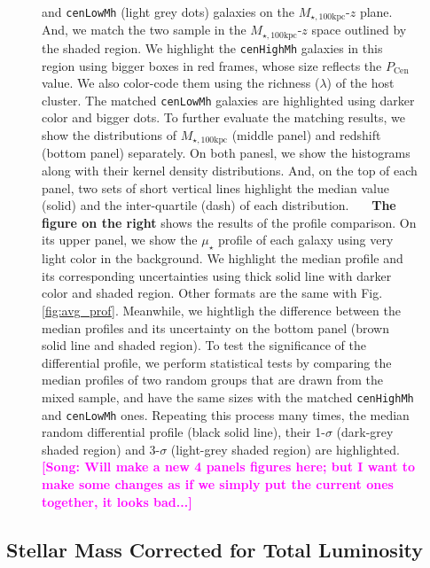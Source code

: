 \documentclass{emulateapj}
\def\rbcg{\texttt{cenHighMh}}
\def\nbcg{\texttt{cenLowMh}}
\def\mtot{{$M_{\star,100\mathrm{kpc}}$}}
\def\mden{{$\mu_{\star}$}}
\newcommand{\song}[1]{\textcolor{magenta}{\textbf{[Song: #1]}}}
\begin{document}
\begin{CJK*}{UTF8}{gbsn}
\begin{figure}[t!]
{      and \nbcg{} (light grey dots) galaxies on the \mtot{}-$z$ plane.  
      And, we match the two sample in the \mtot{}-$z$ space outlined by the shaded region.
      We highlight the \rbcg{} galaxies in this region using bigger boxes in red frames, 
      whose size reflects the $P_{\mathrm{Cen}}$ value.  
      We also color-code them using the richness ($\lambda$) of the host cluster. 
      The matched \nbcg{} galaxies are highlighted using darker color and bigger dots. 
      To further evaluate the matching results, we show the distributions of \mtot{} 
      (middle panel) and redshift (bottom panel) separately. 
      On both panesl, we show the histograms along with their kernel density 
      distributions.  
      And, on the top of each panel, two sets of short vertical lines highlight the median 
      value (solid) and the inter-quartile (dash) of each distribution.~~~
      \textbf{The figure on the right} shows the results of the profile comparison.  
      On its upper panel, we show the \mden{} profile of each galaxy using very light 
      color in the background.  
      We highlight the median profile and its corresponding uncertainties using thick 
      solid line with darker color and shaded region. 
      Other formats are the same with Fig.\ref{fig:avg_prof}.
      Meanwhile, we hightligh the difference between the median profiles and its 
      uncertainty on the bottom panel (brown solid line and shaded region).
      To test the significance of the differential profile, we perform statistical tests 
      by comparing the median profiles of two random groups that are drawn from the 
      mixed sample, and have the same sizes with the matched \rbcg{} and \nbcg{} ones.
      Repeating this process many times, the median random differential profile 
      (black solid line), their 1-$\sigma$ (dark-grey shaded region) and 3-$\sigma$
      (light-grey shaded region) are highlighted.
      \song{Will make a new 4 panels figures here; but I want to make some changes as 
      if we simply put the current ones together, it looks bad...}}  
      \label{fig:prof_m100_A}
  \end{figure}

\subsection{Stellar Mass Corrected for Total Luminosity}
    \label{ssec:mtotal}
    

\end{CJK*}
\end{document}
